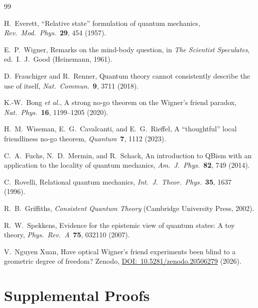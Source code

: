\documentclass[12pt,a4paper]{article}
\theoremstyle{plain}
\theoremstyle{definition}
\theoremstyle{remark}
\begin{document}

\begin{thebibliography}{99}

H.~Everett,
``Relative state'' formulation of quantum mechanics,
\textit{Rev.\ Mod.\ Phys.}\ \textbf{29}, 454 (1957).

E.~P.~Wigner,
Remarks on the mind-body question,
in \textit{The Scientist Speculates}, ed.\ I.~J.~Good
(Heinemann, 1961).

D.~Frauchiger and R.~Renner,
Quantum theory cannot consistently describe the use of itself,
\textit{Nat.\ Commun.}\ \textbf{9}, 3711 (2018).

K.-W.~Bong \textit{et al.},
A strong no-go theorem on the Wigner's friend paradox,
\textit{Nat.\ Phys.}\ \textbf{16}, 1199--1205 (2020).

H.~M.~Wiseman, E.~G.~Cavalcanti, and E.~G.~Rieffel,
A ``thoughtful'' local friendliness no-go theorem,
\textit{Quantum}\ \textbf{7}, 1112 (2023).

C.~A.~Fuchs, N.~D.~Mermin, and R.~Schack,
An introduction to QBism with an application to the locality of
quantum mechanics,
\textit{Am.\ J.\ Phys.}\ \textbf{82}, 749 (2014).

C.~Rovelli,
Relational quantum mechanics,
\textit{Int.\ J.\ Theor.\ Phys.}\ \textbf{35}, 1637 (1996).

R.~B.~Griffiths,
\textit{Consistent Quantum Theory}
(Cambridge University Press, 2002).

R.~W.~Spekkens,
Evidence for the epistemic view of quantum states: A toy theory,
\textit{Phys.\ Rev.\ A}\ \textbf{75}, 032110 (2007).


V.~Nguyen Xuan,
Have optical Wigner's friend experiments been blind to a geometric
degree of freedom?
Zenodo,
\href{https://doi.org/10.5281/zenodo.20506279}%
     {DOI:~10.5281/zenodo.20506279} (2026).

\end{thebibliography}

\appendix
\section{Supplemental Proofs}
\label{app:proofs}
\end{document}
